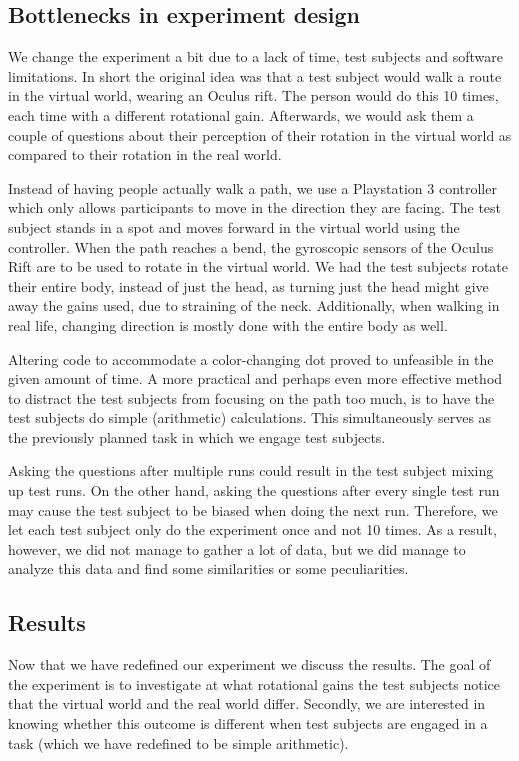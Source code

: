 \subsection{Bottlenecks in experiment design}
We change the experiment a bit due to a lack of time, test subjects and software limitations.
In short the original idea was that a test subject would walk a route in the virtual world, wearing an Oculus rift.
The person would do this 10 times, each time with a different rotational gain.
Afterwards, we would ask them a couple of questions about their perception of their rotation in the virtual world as compared to their rotation in the real world.

Instead of having people actually walk a path, we use a Playstation 3 controller which only allows participants to move in the direction they are facing.
The test subject stands in a spot and moves forward in the virtual world using the controller.
When the path reaches a bend, the gyroscopic sensors of the Oculus Rift are to be used to rotate in the virtual world.
We had the test subjects rotate their entire body, instead of just the head, as turning just the head might give away the gains used, due to straining of the neck.
Additionally, when walking in real life, changing direction is mostly done with the entire body as well.

Altering code to accommodate a color-changing dot proved to unfeasible in the given amount of time. 
A more practical and perhaps even more effective method to distract the test subjects from focusing on the path too much, is to have the test subjects do simple (arithmetic) calculations.
This simultaneously serves as the previously planned task in which we engage test subjects.

Asking the questions after multiple runs could result in the test subject mixing up test runs.
On the other hand, asking the questions after every single test run may cause the test subject to be biased when doing the next run.
Therefore, we let each test subject only do the experiment once and not 10 times.
As a result, however, we did not manage to gather a lot of data, but we did manage to analyze this data and find some similarities or some peculiarities.

\subsection{Results}
Now that we have redefined our experiment we discuss the results.
The goal of the experiment is to investigate at what rotational gains the test subjects notice that the virtual world and the real world differ.
Secondly, we are interested in knowing whether this outcome is different when test subjects are engaged in a task (which we have redefined to be simple arithmetic).

